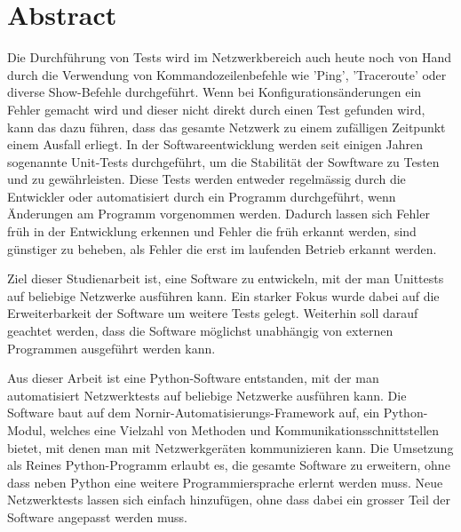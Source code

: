 \documentclass[]{subfiles}
\begin{document}
\section*{Abstract}
    Die Durchführung von Tests wird im Netzwerkbereich auch heute noch von Hand durch die Verwendung
    von Kommandozeilenbefehle wie 'Ping', 'Traceroute' oder diverse Show-Befehle durchgeführt.
    Wenn bei Konfigurationsänderungen ein Fehler gemacht wird und dieser nicht direkt durch
    einen Test gefunden wird, kann das dazu führen, dass das gesamte Netzwerk zu einem 
    zufälligen Zeitpunkt einem Ausfall erliegt.
    In der Softwareentwicklung werden seit einigen Jahren sogenannte Unit-Tests durchgeführt,
    um die Stabilität der Sowftware zu Testen und zu gewährleisten.
    Diese Tests werden entweder regelmässig durch die Entwickler oder automatisiert durch
    ein Programm durchgeführt, wenn Änderungen am Programm vorgenommen werden.
    Dadurch lassen sich Fehler früh in der Entwicklung erkennen und Fehler die früh erkannt 
    werden, sind günstiger zu beheben, als Fehler die erst im laufenden Betrieb erkannt werden.

    Ziel dieser Studienarbeit ist, eine Software zu entwickeln, mit der man Unittests
    auf beliebige Netzwerke ausführen kann. 
    Ein starker Fokus wurde dabei auf die Erweiterbarkeit der Software um weitere Tests gelegt.
    Weiterhin soll darauf geachtet werden, dass die Software möglichst unabhängig von externen
    Programmen ausgeführt werden kann.

    Aus dieser Arbeit ist eine Python-Software entstanden, mit der man automatisiert Netzwerktests
    auf beliebige Netzwerke ausführen kann.
    Die Software baut auf dem Nornir-Automatisierungs-Framework auf, ein Python-Modul, welches
    eine Vielzahl von Methoden und Kommunikationsschnittstellen bietet, 
    mit denen man mit Netzwerkgeräten kommunizieren kann.
    Die Umsetzung als Reines Python-Programm erlaubt es, die gesamte Software zu erweitern, 
    ohne dass neben Python eine weitere Programmiersprache erlernt werden muss.
    Neue Netzwerktests lassen sich einfach hinzufügen, ohne dass dabei ein grosser Teil der 
    Software angepasst werden muss.



    
\end{document}
